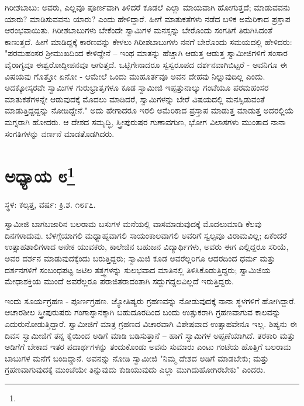 ಗಿರೀಶಬಾಬು: ಅವರು, ಎಲ್ಲವೂ ಪೂರ್ಣವಾಗಿ ತಿಳಿದರೆ ಕೂಡಲೆ ಎಲ್ಲಾ ಮಾಯವಾಗಿ ಹೋಗುತ್ತದೆ; ಮಾಡುವವನು ಯಾರು? ಮಾಡಿಸುವವನು ಯಾರು? ಎಂದು ಹೇಳಿದ್ದಾರೆ. ಹೀಗೆ ಮಾತುಕತೆಗಳು ನಡೆದ ಬಳಿಕ ಅಮೆರಿಕಾದ ಪ್ರಸ್ತಾಪ ಆರಂಭವಾಯಿತು. ಗಿರೀಶಬಾಬುಗಳು ಬೇಕೆಂದೇ ಸ್ವಾಮಿಗಳ ಮನಸ್ಸನ್ನು ಬೇರೊಂದು ಸಂಗತಿಗೆ ತಿರುಗಿಸಿದಂತೆ ಕಾಣುತ್ತದೆ. ಹೀಗೆ ಮಾಡಿದ್ದಕ್ಕೆ ಕಾರಣವನ್ನು ಕೇಳಲು ಗಿರೀಶಬಾಬುಗಳು ನನಗೆ ಬೇರೊಂದು ಸಮಯದಲ್ಲಿ ಹೇಳಿದರು: "ಪರಮಹಂಸರ ಶ‍್ರೀಮುಖದಿಂದ ಕೇಳಿದ್ದೇನೆ – ಇಂಥ ಮಾತನ್ನು ಹೆಚ್ಚಾಗಿ ಆಡುತ್ತ ಆಡುತ್ತ ಸ್ವಾಮೀಜಿಗಳಿಗೆ ಸಂಸಾರ ವೈರಾಗ್ಯವೂ ಈಶ್ವರೋದ್ದೀಪನವೂ ಆಗುತ್ತದೆ. ಒಟ್ಟಿಗೇನಾದರೂ ಸ್ವಸ್ವರೂಪದ ದರ್ಶನವಾಗಿಬಿಟ್ಟರೆ - ಅವನಿಗೂ ಈ ವಿಷಯವು ಗೊತ್ತೋ ಏನೋ - ಆಮೇಲೆ ಒಂದು ಮುಹೂರ್ತವೂ ಅವನ ದೇಹವು ನಿಲ್ಲುವುದಿಲ್ಲ ಎಂದು. ಅದಕ್ಕೋಸ್ಕರವೇ ಸ್ವಾಮಿಗಳ ಗುರುಭ್ರಾತೃಗಳೂ ಕೂಡ ಸ್ವಾಮೀಜಿ ಇಪ್ಪತ್ತುನಾಲ್ಕು ಗಂಟೆಯೂ ಪರಮಹಂಸರ ಮಾತುಕತೆಗಳನ್ನೇ ಆಡುವುದಕ್ಕೆ ಮೊದಲು ಮಾಡಿದರೆ, ಸ್ವಾಮಿಗಳನ್ನು ಬೇರೆ ವಿಷಯದಲ್ಲಿ ಮನಸ್ಸಿಡುವಂತೆ ಮಾಡುತ್ತಿದ್ದದ್ದನ್ನು ನೋಡಿದ್ದೇನೆ." ಅದು ಹೇಗಾದರೂ ಇರಲಿ ಅಮೆರಿಕಾದ ಪ್ರಸ್ತಾಪ ಮಾಡುತ್ತ ಮಾಡುತ್ತ ಅದರಲ್ಲಿಯೆ ಮಗ್ನರಾಗಿ ಹೋದರು. ಆ ದೇಶದ ಸಮೃದ್ಧಿ, ಸ್ತ್ರೀಪುರುಷರ ಗುಣಾವಗುಣ, ಭೋಗ ವಿಲಾಸಗಳು ಮುಂತಾದ ನಾನಾ ಸಂಗತಿಗಳನ್ನು ವರ್ಣನೆ ಮಾಡತೊಡಗಿದರು.

\newpage

\chapter[ಅಧ್ಯಾಯ ೮]{ಅಧ್ಯಾಯ ೮\protect\footnote{}}

\begin{center}
ಸ್ಥಳ: ಕಲ್ಕತ್ತ, ವರ್ಷ: ಕ್ರಿ.ಶ. ೧೮೯೭.
\end{center}

ಸ್ವಾಮೀಜಿ ಬಾಗಬಜಾರಿನ ಬಲರಾಮ ಬಸುಗಳ ಮನೆಯಲ್ಲಿ ವಾಸಮಾಡುವುದಕ್ಕೆ ಮೊದಲುಮಾಡಿ ಕೆಲವು ದಿನಗಳಾದುವು. ಬೆಳಗ್ಗೆಯಾಗಲಿ ಮಧ್ಯಾಹ್ನವಾಗಲಿ ಸಾಯಂಕಾಲವಾಗಲಿ ಅವರಿಗೆ ಸ್ವಲ್ಪವೂ ವಿರಾಮವಿಲ್ಲ; ಏಕೆಂದರೆ ಉತ್ಸಾಹಶಾಲಿಗಳಾದ ಅನೇಕ ಯುವಕರು, ಕಾಲೇಜಿನ ಬಹುಜನ ವಿದ್ಯಾರ್ಥಿಗಳು, ಅವರು ಈಗ ಎಲ್ಲಿದ್ದರೂ ಸರಿಯೆ, ಅವರ ದರ್ಶನ ಮಾಡುವುದಕ್ಕೆಂದು ಬರುತ್ತಿದ್ದರು; ಸ್ವಾಮಿಜಿ ಕೂಡ ಅವರೆಲ್ಲರಿಗೂ ಆದರದಿಂದ ಧರ್ಮ ಮತ್ತು ದರ್ಶನಗಳಿಗೆ ಸಂಬಂಧಪಟ್ಟ ಜಟಿಲ ತತ್ತ್ವಗಳನ್ನು ಸುಲಭವಾದ ಮಾತಿನಲ್ಲಿ ತಿಳಿಸಿಕೊಡುತ್ತಿದ್ದರು; ಸ್ವಾಮಿಜಿಯ ಮೇಧಾಶಕ್ತಿಯ ಮುಂದೆ ಅವರೆಲ್ಲರೂ ಪರಾಜಿತರಾದಂತಾಗಿ ಸದ್ದುಗದ್ದಲವಿಲ್ಲದೆ ಇರುತ್ತಿದ್ದರು.

ಇಂದು ಸೂರ್ಯಗ್ರಹಣ - ಪೂರ್ಣಗ್ರಹಣ. ಜ್ಯೋತಿಷ್ಯರು ಗ್ರಹಣವನ್ನು ನೋಡುವುದಕ್ಕೆ ನಾನಾ ಸ್ಥಳಗಳಿಗೆ ಹೋಗಿದ್ದಾರೆ. ಆಚಾರಶೀಲ ಸ್ತ್ರೀಪುರುಷರು ಗಂಗಾಸ್ನಾನಕ್ಕಾಗಿ ಬಹುದೂರದಿಂದ ಬಂದು ಉತ್ಸುಕರಾಗಿ ಗ್ರಹಣವಾಗುವ ಕಾಲವನ್ನು ಎದುರುನೋಡುತ್ತಿದ್ದಾರೆ. ಸ್ವಾಮೀಜಿಗೆ ಮಾತ್ರ ಗ್ರಹಣದ ವಿಚಾರವಾಗಿ ವಿಶೇಷವಾದ ಉತ್ಸಾಹವೇನೂ ಇಲ್ಲ. ಶಿಷ್ಯನು ಈ ದಿವಸ ಸ್ವಾಮೀಜಿಗೆ ತನ್ನ ಕೈಯಿಂದ ಅಡಿಗೆ ಮಾಡಿ ಬಡಿಸುತ್ತಾನೆ – ಹಾಗೆ ಸ್ವಾಮಿಗಳ ಅಪ್ಪಣೆಯಾಗಿದೆ. ತರಕಾರಿ ಮತ್ತು ಅಡಿಗೆಗೆ ಬೇಕಾದ ಇತರ ಪದಾರ್ಥಗಳನ್ನು ತಂದುಕೊಂಡು ಅವನು ಸುಮಾರು ಎಂಟು ಗಂಟೆಯ ಹೊತ್ತಿಗೆ ಬಲರಾಮ ಬಾಬುಗಳ ಮನೆಗೆ ಬಂದಿದ್ದಾನೆ. ಅವನನ್ನು ನೋಡಿ ಸ್ವಾಮೀಜಿ "ನಿಮ್ಮ ದೇಶದ ಅಡಿಗೆ ಮಾಡಬೇಕು; ಮತ್ತು ಗ್ರಹಣವಾಗುವುದಕ್ಕೆ ಮುಂಚೆಯೇ ತಿನ್ನುವುದು ಕುಡಿಯುವುದು ಎಲ್ಲಾ ಮುಗಿದುಹೋಗಿರಬೇಕು" ಎಂದರು.

